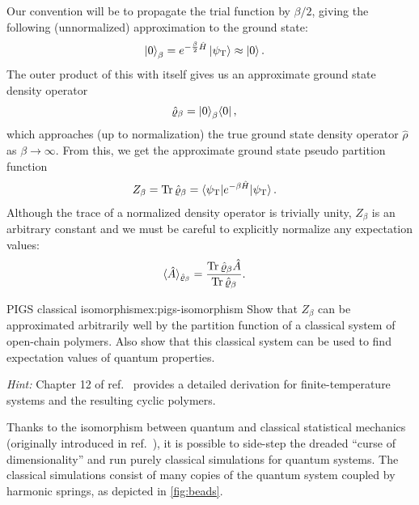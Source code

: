 Our convention will be to propagate the trial function by $\beta/2$, giving the following (unnormalized) approximation to the ground state:
\begin{align}
	\ket{0}_\beta
	&= e^{-\frac{\beta}{2} \hat{H}} \ket{\psi_\mathrm{T}}
	\approx \ket{0}.
\end{align}
The outer product of this with itself gives us an approximate ground state density operator
\begin{align}
	\hat{\varrho}_\beta
	&= \ket{0}_\beta\!\bra{0},
\end{align}
which approaches (up to normalization) the true ground state density operator $\hat{\rho}$ as $\beta \to \infty$.
From this, we get the approximate ground state pseudo partition function
\begin{align}
	Z_\beta
	&= \operatorname{Tr}{\hat{\varrho}_\beta}
	= \braket{\psi_\mathrm{T} | e^{-\beta \hat{H}} | \psi_\mathrm{T}}.
\end{align}
Although the trace of a normalized density operator is trivially unity, $Z_\beta$ is an arbitrary constant and we must be careful to explicitly normalize any expectation values:
\begin{align}
	\langle \hat{A} \rangle_{\hat{\varrho}_\beta}
	&= \frac{\operatorname{Tr}{\hat{\varrho}_\beta \hat{A}}}{\operatorname{Tr}{\hat{\varrho}_\beta}}.
\end{align}

\begin{DefExercise}{PIGS classical isomorphism}{ex:pigs-isomorphism}
	Show that $Z_\beta$ can be approximated arbitrarily well by the partition function of a classical system of open-chain polymers.
	Also show that this classical system can be used to find expectation values of quantum properties.

	\textit{Hint:} Chapter 12 of ref.~\cite{tuckerman2010statistical} provides a detailed derivation for finite-temperature systems and the resulting cyclic polymers.
\end{DefExercise}

Thanks to the isomorphism between quantum and classical statistical mechanics (originally introduced in ref.~\cite{chandler1981exploiting}), it is possible to side-step the dreaded ``curse of dimensionality'' and run purely classical simulations for quantum systems.
The classical simulations consist of many copies of the quantum system coupled by harmonic springs, as depicted in \cref{fig:beads}.

